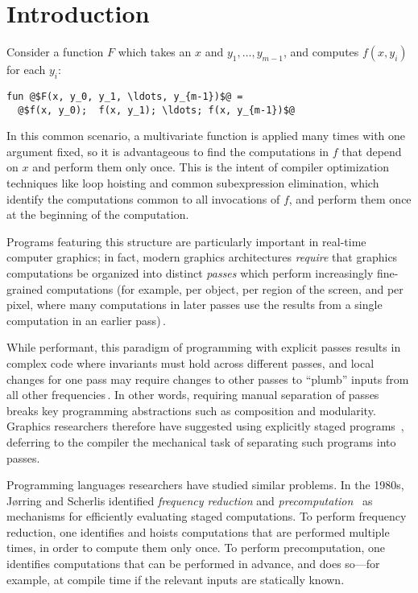 \section{Introduction}
\label{sec:intro}

Consider a function $F$ which takes an $x$ and $y_1,\dots,y_{m-1}$, and computes
$f(x,y_i)$ for each $y_i$:
\begin{lstlisting}
fun @$F(x, y_0, y_1, \ldots, y_{m-1})$@ = 
  @$f(x, y_0);  f(x, y_1); \ldots; f(x, y_{m-1})$@
\end{lstlisting}
%
In this common scenario, a multivariate function is applied many times with one
argument fixed, so it is advantageous to find the computations in $f$ that
depend on $x$ and perform them only once. This is the intent of compiler
optimization techniques like loop hoisting and common subexpression elimination,
which identify the computations common to all invocations of $f$, and perform
them once at the beginning of the computation.

Programs featuring this structure are particularly important in real-time
computer graphics; in fact, modern graphics architectures \emph{require} that
graphics computations be organized into distinct {\em passes} which perform
increasingly fine-grained computations (for example, per object, per region of
the screen, and per pixel, where many computations in later passes use the
results from a single computation in an earlier pass)\,\cite{OpenGL4Spec}.

While performant, this paradigm of programming with explicit passes results in
complex code where invariants must hold across different passes, and local
changes for one pass may require changes to other passes to ``plumb'' inputs
from all other frequencies\,\cite{Foley:2011}.
%
In other words, requiring manual separation of passes breaks key programming
abstractions such as composition and modularity.
%
Graphics researchers therefore have suggested using explicitly staged programs
\,\cite{Proudfoot:2001,Foley:2011,He:2014}, deferring to the compiler the
mechanical task of separating such programs into passes.

Programming languages researchers have studied similar problems. In the 1980s,
J{\o}rring and Scherlis identified {\em frequency reduction} and {\em
precomputation}~\cite{JS86-staging} as mechanisms for efficiently evaluating
staged computations. To perform frequency reduction, one identifies and hoists
computations that are performed multiple times, in order to compute them only
once. To perform precomputation, one identifies computations that can be
performed in advance, and does so---for example, at compile time if the relevant
inputs are statically known.


